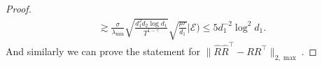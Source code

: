 \documentclass[12pt]{article}
\newcommand{\PP}{\mathbb{P}}
\def\calE{{\mathcal E}}
\def\PP{{\mathbb P}}
\theoremstyle{plain}
\begin{document}
\begin{proof}
\begin{align*}
        \gtrsim \frac{\sigma}{\lambda_{\min}}\sqrt{\frac{d_1^2d_2\log d_1}{T^{1-\gamma}}}\sqrt{\frac{\mu r}{d_1}}\bigg|\calE\bigg)\leq 5d_1^{-2}\log^2d_1.
    \end{align*}
    And similarly we can prove the statement for $\|\widehat{R}\widehat{R}^{\top}-RR^{\top}\|_{2,\max}$. 
    
    
\end{proof}
\end{document}
